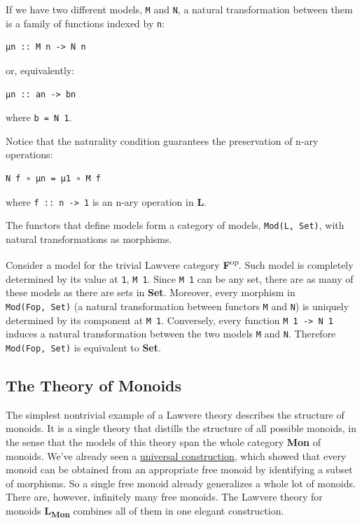 If we have two different models, \texttt{M} and \texttt{N}, a natural
transformation between them is a family of functions indexed by
\texttt{n}:

\begin{verbatim}
μn :: M n -> N n
\end{verbatim}

or, equivalently:

\begin{verbatim}
μn :: an -> bn
\end{verbatim}

where \texttt{b\ =\ N\ 1}.

Notice that the naturality condition guarantees the preservation of
n-ary operations:

\begin{verbatim}
N f ∘ μn = μ1 ∘ M f
\end{verbatim}

where \texttt{f\ ::\ n\ -\textgreater{}\ 1} is an n-ary operation in
\textbf{L}.

The functors that define models form a category of models,
\texttt{Mod(L,\ Set)}, with natural transformations as morphisms.

Consider a model for the trivial Lawvere category
\textbf{F}\textsuperscript{op}. Such model is completely determined by
its value at \texttt{1}, \texttt{M\ 1}. Since \texttt{M\ 1} can be any
set, there are as many of these models as there are sets in
\textbf{Set}. Moreover, every morphism in \texttt{Mod(Fop,\ Set)} (a
natural transformation between functors \texttt{M} and \texttt{N}) is
uniquely determined by its component at \texttt{M\ 1}. Conversely, every
function \texttt{M\ 1\ -\textgreater{}\ N\ 1} induces a natural
transformation between the two models \texttt{M} and \texttt{N}.
Therefore \texttt{Mod(Fop,\ Set)} is equivalent to \textbf{Set}.

\subsection{The Theory of Monoids}\label{the-theory-of-monoids}

The simplest nontrivial example of a Lawvere theory describes the
structure of monoids. It is a single theory that distills the structure
of all possible monoids, in the sense that the models of this theory
span the whole category \textbf{Mon} of monoids. We've already seen a
\href{https://bartoszmilewski.com/2015/07/21/free-monoids/}{universal
construction}, which showed that every monoid can be obtained from an
appropriate free monoid by identifying a subset of morphisms. So a
single free monoid already generalizes a whole lot of monoids. There
are, however, infinitely many free monoids. The Lawvere theory for
monoids \textbf{L\textsubscript{Mon}} combines all of them in one
elegant construction.

